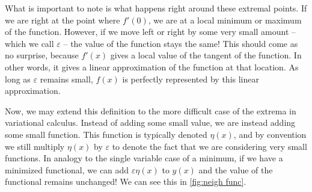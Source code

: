 What is important to note is what happens right around these extremal points. If we are right at the point where $f'(0)$, we are at a local minimum or maximum of the function. However, if we move left or right by some very small amount -- which we call $\varepsilon$ -- the value of the function stays the same! This should come as no surprise, because $f'(x)$ gives a local value of the tangent of the function. In other words, it gives a linear approximation of the function at that location. As long as $\varepsilon$ remains small, $f(x)$ is perfectly represented by this linear approximation.

Now, we may extend this definition to the more difficult case of the extrema in variational calculus. Instead of adding some small value, we are instead adding some small function. This function is typically denoted $\eta(x)$, and by convention we still multiply $\eta(x)$ by $\varepsilon$ to denote the fact that we are considering very small functions. In analogy to the single variable case of a minimum, if we have a minimized functional, we can add $\varepsilon\eta(x)$ to $y(x)$ and the value of the functional remains unchanged! We can see this in \autoref{fig:neigh func}.

